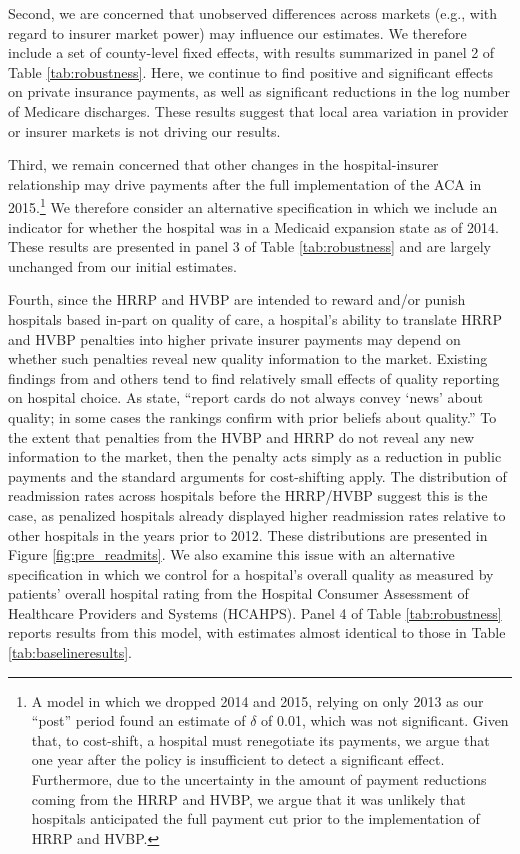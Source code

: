 \documentclass[12pt]{article}
\begin{document}
Second, we are concerned that unobserved differences across markets (e.g., with regard to insurer market power) may influence our estimates. We therefore include a set of county-level fixed effects, with results summarized in panel 2 of Table \ref{tab:robustness}. Here, we continue to find positive and significant effects on private insurance payments, as well as significant reductions in the log number of Medicare discharges. These results suggest that local area variation in provider or insurer markets is not driving our results.

Third, we remain concerned that other changes in the hospital-insurer relationship may drive payments after the full implementation of the ACA in 2015.\footnote{A model in which we dropped 2014 and 2015, relying on only 2013 as our ``post'' period found an estimate of $\delta$ of 0.01, which was not significant.  Given that, to cost-shift, a hospital must renegotiate its payments, we argue that one year after the policy is insufficient to detect a significant effect.  Furthermore, due to the uncertainty in the amount of payment reductions coming from the HRRP and HVBP, we argue that it was unlikely that hospitals anticipated the full payment cut prior to the implementation of HRRP and HVBP.} We therefore consider an alternative specification in which we include an indicator for whether the hospital was in a Medicaid expansion state as of 2014. These results are presented in panel 3 of Table \ref{tab:robustness} and are largely unchanged from our initial estimates.

Fourth, since the HRRP and HVBP are intended to reward and/or punish hospitals based in-part on quality of care, a hospital's ability to translate HRRP and HVBP penalties into higher private insurer payments may depend on whether such penalties reveal new quality information to the market. Existing findings from \cite{dranove2008} and others tend to find relatively small effects of quality reporting on hospital choice. As \cite{dranove2008} state, ``report cards do not always convey `news' about quality; in some cases the rankings confirm with prior beliefs about quality.'' To the extent that penalties from the HVBP and HRRP do not reveal any new information to the market, then the penalty acts simply as a reduction in public payments and the standard arguments for cost-shifting apply. The distribution of readmission rates across hospitals before the HRRP/HVBP suggest this is the case, as penalized hospitals already displayed higher readmission rates relative to other hospitals in the years prior to 2012. These distributions are presented in Figure \ref{fig:pre_readmits}. We also examine this issue with an alternative specification in which we control for a hospital's overall quality as measured by patients' overall hospital rating from the Hospital Consumer Assessment of Healthcare Providers and Systems (HCAHPS).  Panel 4 of Table \ref{tab:robustness} reports results from this model, with estimates almost identical to those in Table \ref{tab:baselineresults}.
\end{document}
